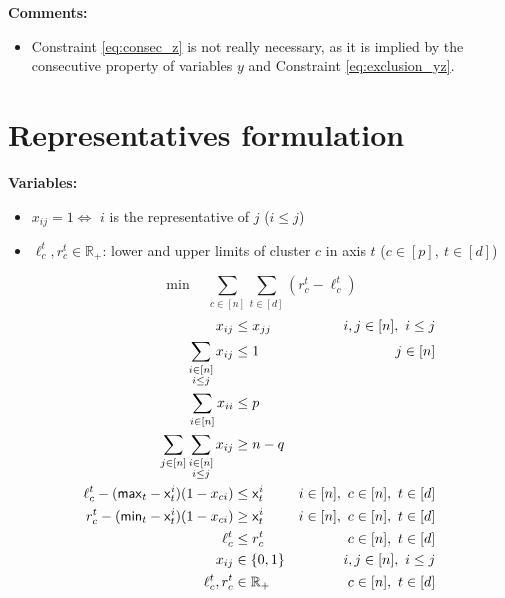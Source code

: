 \documentclass[12pt,A4wide]{article}
\begin{document}
\textbf{Comments:}
\begin{itemize}
	\item Constraint \eqref{eq:consec_z} is not really necessary, as it is implied by the consecutive property of variables $y$ and Constraint \eqref{eq:exclusion_yz}.
\end{itemize}


\section*{Representatives formulation}

\textbf{Variables:}
\begin{itemize}
	\item $x_{ij} = 1 \Leftrightarrow$ $i$ is the representative of $j$ ($i \leq j$)
	\item $\ell^t_c, r^t_c\in \mathbb{R}_+$: lower and upper limits of cluster $c$ in axis $t$ ($c \in [p], ~ t \in [d]$)
\end{itemize}

$$
\min \quad \sum_{c \in [n]} \sum_{t \in [d]} (r^t_c - \ell^t_c) 
$$
\begin{align}
	x_{ij} &\leq x_{jj} & i,j \in [n],~ i \leq j\\
	\sum_{\substack{i \in [n]\\i\leq j}} x_{ij} &\leq 1 & j \in [n]\\
	\sum_{i \in [n]} x_{ii} &\leq p & \\
	\sum_{j \in [n]} \sum_{\substack{i \in [n]\\i\leq j}} x_{ij} &\geq n - q & \\
	\ell^t_c - (\mathsf{max}_t - \mathsf{x}^i_t) (1 - x_{ci})&\leq \mathsf{x}^i_t  & i \in [n],~ c \in [n],~ t \in [d]\\
	r^t_c - (\mathsf{min}_t - \mathsf{x}^i_t) (1 - x_{ci})&\geq \mathsf{x}^i_t  & i \in [n],~ c \in [n],~ t \in [d]\\
	\ell^t_c &\leq r^t_c & c \in [n],~ t \in [d]\\
	x_{ij} &\in \{0,1\} & i,j \in [n],~ i \leq j\\
	\ell^t_c, r^t_c &\in \mathbb{R}_+ & c \in [n],~ t \in [d]
\end{align}

%
%
\end{document}
